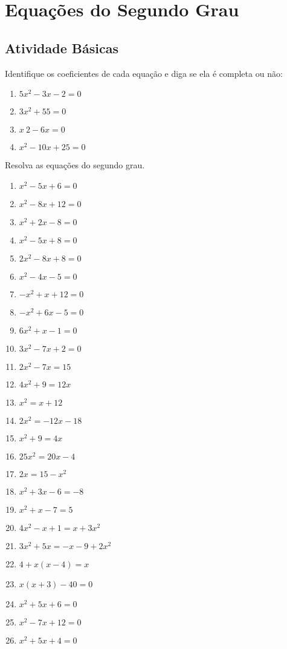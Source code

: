 \chapter{Equações do Segundo Grau}
	\section{Atividade Básicas}
	
	\item Identifique os coeficientes de cada equação e diga se ela é completa ou não:
		\begin{multicols}{2}
		\begin{enumerate}
		\item $5x^2 - 3x - 2 = 0$                                                 
		\item $3x^2  + 55 = 0$                                                     
		\item $x~2 - 6x = 0$                                               
		\item $x^2 - 10x + 25 = 0$
		\end{enumerate}	
		\end{multicols}		
	\item Resolva as equações do segundo grau.
	\begin{multicols}{3}
	\begin{enumerate}
		\item $x^2 - 5x + 6 = 0$
		\item $x^2 - 8x + 12 = 0$
		\item $x^2 + 2x - 8 = 0$
		\item $x^2 - 5x + 8 = 0$
		\item $2x^2 - 8x + 8 = 0$  
		\item $x^2 - 4x - 5 = 0$
		\item $-x^2 + x + 12 = 0$  
		\item $-x^2 + 6x - 5 = 0$ 
		\item $6x^2 + x - 1 = 0$
		\item $3x^2 - 7x + 2 = 0$
		\item $2x^2 - 7x = 15$
		\item $4x^2 + 9 = 12x$
		\item $x^2 = x + 12$
		\item $2x^2 = -12x - 18$
		\item $x^2 + 9 = 4x$
		\item $25x^2 = 20x - 4$
		\item $2x = 15 - x^2$
		\item $x^2 + 3x - 6 = -8$
		\item $x^2 + x - 7 = 5$
		\item $4x^2 - x + 1 = x + 3x^2$
		\item $3x^2 + 5x = -x - 9 + 2x^2$
		\item $4 + x ( x - 4) = x$
		\item $x ( x + 3) - 40 = 0$
		\item $x^2 + 5x + 6 = 0$
		\item $x^2 - 7x + 12 = 0$
		\item $x^2 + 5x + 4 = 0$
	\end{enumerate}
	\end{multicols}
